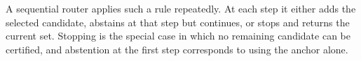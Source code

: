 A sequential router applies such a rule repeatedly. At each step it either
adds the selected candidate, abstains at that step but continues, or stops and
returns the current set. Stopping is the special case in which no remaining
candidate can be certified, and abstention at the first step corresponds to
using the anchor alone.
